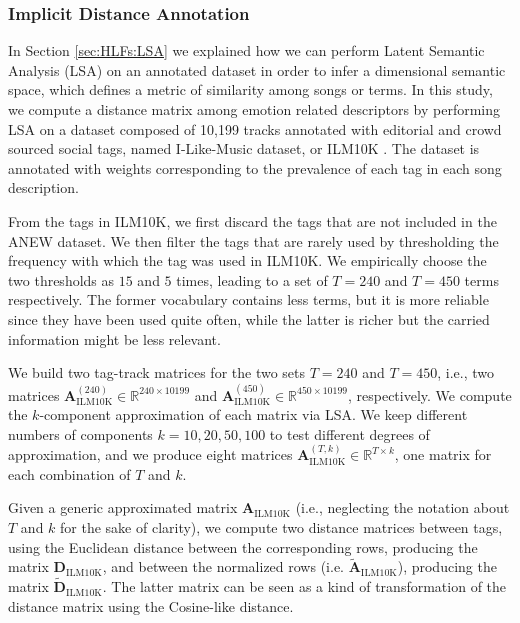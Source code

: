 \subsubsection{Implicit Distance Annotation}\label{sec:ANEW:ILM}
In Section \ref{sec:HLFs:LSA} we explained how we can perform  Latent Semantic Analysis (LSA) on an annotated dataset in order to infer a dimensional semantic space, which defines a metric of similarity among songs or terms. In this study, we compute a distance matrix among emotion related descriptors by performing LSA on a dataset composed of 10,199 tracks annotated with editorial and crowd sourced social tags, named I-Like-Music dataset, or ILM10K \cite{Saari2015, Allik2016}.
The dataset is annotated with weights corresponding to the prevalence of each tag in each song description. 

From the tags in ILM10K, we first discard the tags that are not included in the ANEW dataset. We then filter the tags that are rarely used by thresholding the frequency with which the tag  was used in ILM10K. We empirically choose the two thresholds as $15$ and $5$ times, leading to a set of $T=240$ and $T=450$ terms respectively. The former vocabulary contains less terms, but it is more reliable since they have been used quite often, while the latter is richer but the carried information might be less relevant. 

We build two tag-track matrices for the two sets $T=240$ and $T=450$, i.e., two matrices $\mathbf{A}_{\text{ILM10K}}^{(240)} \in \mathbb{R}^{240 \times 10199} $ and $\mathbf{A}_{\text{ILM10K}}^{(450)} \in \mathbb{R}^{450 \times 10199} $, respectively. We compute the $k$-component approximation of each matrix via LSA. We keep different numbers of components $k=10, 20, 50, 100$ to test different degrees of approximation, and we produce eight matrices $\mathbf{A}_{\text{ILM10K}}^{(T,k)} \in \mathbb{R}^{T \times k} $, one matrix for each combination of $T$ and $k$. 
 
Given a generic approximated matrix $\mathbf{A}_{\text{ILM10K}}$ (i.e., neglecting the notation about $T$ and $k$ for the sake of clarity), we compute two distance matrices between tags, using the Euclidean distance between the corresponding rows, producing the matrix  $\mathbf{D}_{\text{ILM10K}}$, and between the normalized rows (i.e.  $\mathbf{\tilde{A}}_{\text{ILM10K}}$), producing the matrix $ \tilde{\mathbf{D}}_{\text{ILM10K}}$. The latter matrix can be seen as a kind of transformation of the distance matrix using the Cosine-like distance. 

